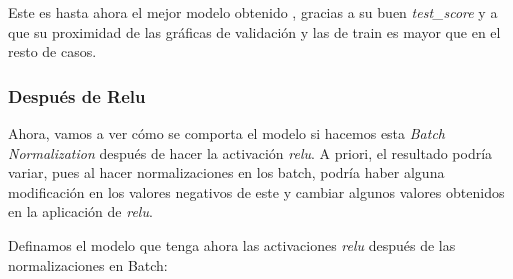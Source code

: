 \documentclass[11pt]{article}
\begin{document}
Este es hasta ahora el mejor modelo obtenido , gracias a su buen
\emph{test\_score} y a que su proximidad de las gráficas de validación y
las de train es mayor que en el resto de casos.

\hypertarget{despuuxe9s-de-relu}{%
\subsubsection{Después de Relu}\label{despuuxe9s-de-relu}}

Ahora, vamos a ver cómo se comporta el modelo si hacemos esta
\emph{Batch Normalization} después de hacer la activación \emph{relu}. A
priori, el resultado podría variar, pues al hacer normalizaciones en los
batch, podría haber alguna modificación en los valores negativos de este
y cambiar algunos valores obtenidos en la aplicación de \emph{relu}.

Definamos el modelo que tenga ahora las activaciones \emph{relu} después
de las normalizaciones en Batch:
\end{document}
